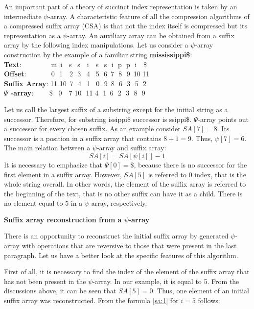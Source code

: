 An important part of a theory of succinct index representation is taken by an intermediate $\psi$-array.
A characteristic feature of all the compression algorithms of a compressed suffix array (CSA) is 
that not the index itself is compressed but its representation as a $\psi$-array.
An auxiliary array can be obtained from a suffix array by the following index manipulations.
Let us consider a $\psi$-array construction by the example of a familiar string \textbf{mississippi\$}:
\\ \textbf{Text}:\,\,\,\,\,\,\,\,\,\,\,\,\,\,\,\,\,\,\,\,\,\,\,\,
m \,i \,\,\,\,s \,\,\,s \,\,\,\,i \,\,\,\,s \,\,\,s \,\,i \,\,p \,\,p \,\,i \,\,\,\,\$
\\ \textbf{Offset}:\,\,\,\,\,\,\,\,\,\,\,\,\,\,\,\,\,\,\,\, 0 \,\,1
\,\,\,\,2 \,\,3 \,\,\,4 \,\,\,5 \,\,6 \,7 \,\,8 \,\,9 \,10 11
\\ \textbf{Suffix Array}:   11 10 \,7 \,\,4 \,\,\,1 \,\,\,0 \,\,9 \,8 \,\,6 \,\,3 \,\,5 \,\,2
\\ \textbf{$\Psi$ -array}: \,\,\,\,\,\,\,\,\,\,\,\,\$ \,\,\,0 \,\,\,\,7
10 \,\,11 4 \,\,1 \,6 \,\,2 \,\,3 \,\,8 \,\,9

Let us call the largest suffix of a substring except for the initial string as a successor.
Therefore, for substring issippi\$ successor is ssippi\$.
$\Psi$-array points out a successor for every chosen suffix.
As an example consider $SA[7] = 8$. Its successor is a position in a suffix array that contains $8 + 1 = 9$.
Thus, $\psi[7] = 6$. The main relation between a $\psi$-array and suffix array:
\begin{equation}\label{sa:1}
SA[i] = SA[\psi[i]] - 1
\end{equation}
It is necessary to emphasize that $\Psi[0] = \$$, because there is no successor
for the first element in a suffix array.
However, $SA[5]$ is referred to 0 index, that is the whole string overall.
In other words, the element of the suffix array is referred to the beginning of the text,
that is no other suffix can have it as a child.
There is no element equal to 5 in a $\psi$-array, respectively.

\textbf{Suffix array reconstruction from a $\psi$-array}

There is an opportunity to reconstruct the initial suffix array by generated $\psi$-array
with operations that are reversive to those that were present in the last paragraph.
Let us have a better look at the specific features of this algorithm.

First of all, it is necessary to find the index of the element of the suffix array
that has not been present in the $\psi$-array.
In our example, it is equal to 5. From the discussions above, it can be seen that $SA[5] = 0$.
Thus, one element of an initial suffix array was reconstructed. From the formula \ref{sa:1} for $i = 5$ follows:

